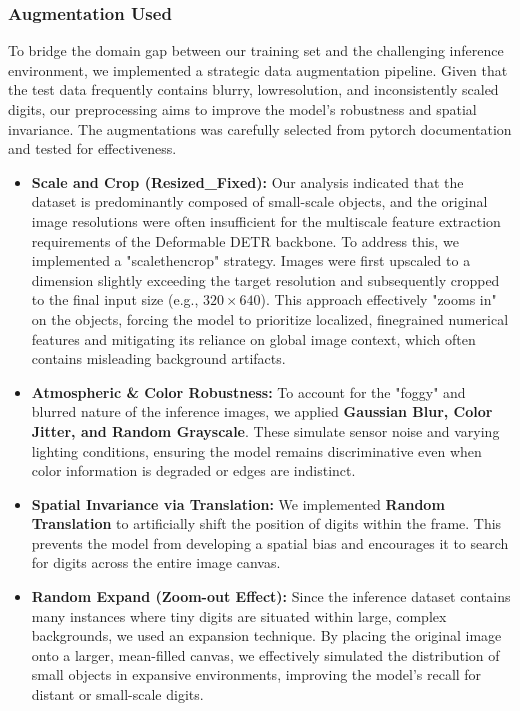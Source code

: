 \documentclass[a4paper]{article} %
\begin{document}
\subsubsection{Augmentation Used}
To bridge the domain gap between our training set and the challenging inference environment, we implemented a strategic data augmentation pipeline. Given that the test data frequently contains blurry, low\-resolution, and inconsistently scaled digits, our preprocessing aims to improve the model's robustness and spatial invariance. The augmentations was carefully selected from pytorch documentation \cite{Augmentation_pytorch_ref} and tested for effectiveness.
\begin{itemize}
    \item \textbf{Scale and Crop (Resized\_Fixed):}  Our analysis indicated that the dataset is predominantly composed of small-scale objects, and the original image resolutions were often insufficient for the multi\-scale feature extraction requirements of the Deformable DETR backbone. To address this, we implemented a "scale\-then\-crop" strategy. Images were first upscaled to a dimension slightly exceeding the target resolution and subsequently cropped to the final input size (e.g., $320 \times 640$). This approach effectively "zooms in" on the objects, forcing the model to prioritize localized, fine\-grained numerical features and mitigating its reliance on global image context, which often contains misleading background artifacts.
    \item \textbf{Atmospheric \& Color Robustness:} To account for the "foggy" and blurred nature of the inference images, we applied \textbf{Gaussian Blur, Color Jitter, and Random Grayscale}. These simulate sensor noise and varying lighting conditions, ensuring the model remains discriminative even when color information is degraded or edges are indistinct.
    \item \textbf{Spatial Invariance via Translation:} We implemented \textbf{Random Translation} to artificially shift the position of digits within the frame. This prevents the model from developing a spatial bias and encourages it to search for digits across the entire image canvas.
    \item \textbf{Random Expand (Zoom-out Effect):} Since the inference dataset contains many instances where tiny digits are situated within large, complex backgrounds, we used an expansion technique. By placing the original image onto a larger, mean-filled canvas, we effectively simulated the distribution of small objects in expansive environments, improving the model's recall for distant or small-scale digits.
\end{itemize}
\end{document}
